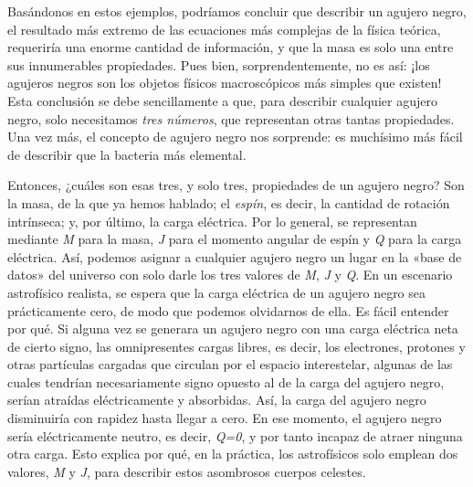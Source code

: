 Basándonos en estos ejemplos, podríamos concluir que describir un agujero negro, el resultado más extremo de las ecuaciones más complejas de la física teórica, requeriría una enorme cantidad de información, y que la masa es solo una entre sus innumerables propiedades. Pues bien, sorprendentemente, no es así: ¡los agujeros negros son los objetos físicos macroscópicos más simples que existen! Esta conclusión se debe sencillamente a que, para describir cualquier agujero negro, solo necesitamos \emph{tres números}, que representan otras tantas propiedades. Una vez más, el concepto de agujero negro nos sorprende: es muchísimo más fácil de describir que la bacteria más elemental.

Entonces, ¿cuáles son esas tres, y solo tres, propiedades de un agujero negro? Son la masa, de la que ya hemos hablado; el \emph{espín}, es decir, la cantidad de rotación intrínseca; y, por último, la carga eléctrica. Por lo general, se representan mediante \emph{M} para la masa, \emph{J} para el momento angular de espín y \emph{Q} para la carga eléctrica. Así, podemos asignar a cualquier agujero negro un lugar en la «base de datos» del universo con solo darle los tres valores de \emph{M}, \emph{J} y \emph{Q}. En un escenario astrofísico realista, se espera que la carga eléctrica de un agujero negro sea prácticamente cero, de modo que podemos olvidarnos de ella. Es fácil entender por qué. Si alguna vez se generara un agujero negro con una carga eléctrica neta de cierto signo, las omnipresentes cargas libres, es decir, los electrones, protones y otras partículas cargadas que circulan por el espacio interestelar, algunas de las cuales tendrían necesariamente signo opuesto al de la carga del agujero negro, serían atraídas eléctricamente y absorbidas. Así, la carga del agujero negro disminuiría con rapidez hasta llegar a cero. En ese momento, el agujero negro sería eléctricamente neutro, es decir, \emph{Q=0}, y por tanto incapaz de atraer ninguna otra carga. Esto explica por qué, en la práctica, los astrofísicos solo emplean dos valores, \emph{M} y \emph{J}, para describir estos asombrosos cuerpos celestes.

